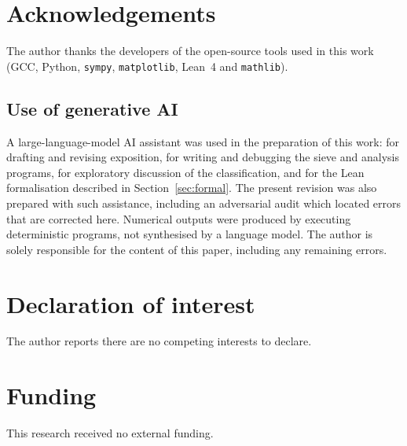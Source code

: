 \documentclass[11pt,reqno]{amsart}
\theoremstyle{plain}
\theoremstyle{definition}
\begin{document}
\section*{Acknowledgements}
The author thanks the developers of the open-source tools used in this work
(GCC, Python, \texttt{sympy}, \texttt{matplotlib}, Lean~4 and
\texttt{mathlib}).

\subsection*{Use of generative AI}
A large-language-model AI assistant was used in the preparation of this work:
for drafting and revising exposition, for writing and debugging the sieve and
analysis programs, for exploratory discussion of the classification, and for
the Lean formalisation described in Section~\ref{sec:formal}. The present
revision was also prepared with such assistance, including an adversarial
audit which located errors that are corrected here. Numerical outputs were
produced by executing deterministic programs, not synthesised by a language
model. The author is solely responsible for the content of this paper,
including any remaining errors.

\section*{Declaration of interest}
The author reports there are no competing interests to declare.

\section*{Funding}
This research received no external funding.
\end{document}
